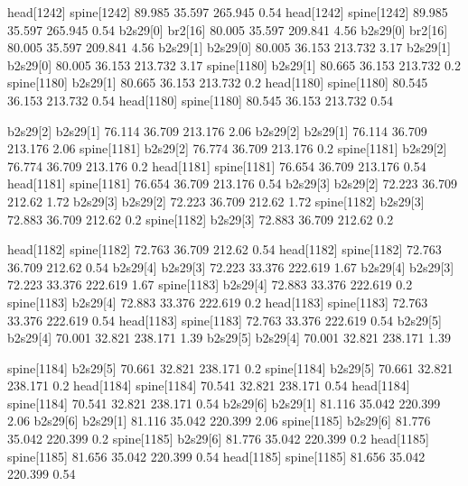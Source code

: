 head[1242]    spine[1242]    89.985    35.597    265.945    0.54
head[1242]    spine[1242]    89.985    35.597    265.945    0.54
b2s29[0]    br2[16]    80.005    35.597    209.841    4.56
b2s29[0]    br2[16]    80.005    35.597    209.841    4.56
b2s29[1]    b2s29[0]    80.005    36.153    213.732    3.17
b2s29[1]    b2s29[0]    80.005    36.153    213.732    3.17
spine[1180]    b2s29[1]    80.665    36.153    213.732    0.2
spine[1180]    b2s29[1]    80.665    36.153    213.732    0.2
head[1180]    spine[1180]    80.545    36.153    213.732    0.54
head[1180]    spine[1180]    80.545    36.153    213.732    0.54


b2s29[2]    b2s29[1]    76.114    36.709    213.176    2.06
b2s29[2]    b2s29[1]    76.114    36.709    213.176    2.06
spine[1181]    b2s29[2]    76.774    36.709    213.176    0.2
spine[1181]    b2s29[2]    76.774    36.709    213.176    0.2
head[1181]    spine[1181]    76.654    36.709    213.176    0.54
head[1181]    spine[1181]    76.654    36.709    213.176    0.54
b2s29[3]    b2s29[2]    72.223    36.709    212.62    1.72
b2s29[3]    b2s29[2]    72.223    36.709    212.62    1.72
spine[1182]    b2s29[3]    72.883    36.709    212.62    0.2
spine[1182]    b2s29[3]    72.883    36.709    212.62    0.2


head[1182]    spine[1182]    72.763    36.709    212.62    0.54
head[1182]    spine[1182]    72.763    36.709    212.62    0.54
b2s29[4]    b2s29[3]    72.223    33.376    222.619    1.67
b2s29[4]    b2s29[3]    72.223    33.376    222.619    1.67
spine[1183]    b2s29[4]    72.883    33.376    222.619    0.2
spine[1183]    b2s29[4]    72.883    33.376    222.619    0.2
head[1183]    spine[1183]    72.763    33.376    222.619    0.54
head[1183]    spine[1183]    72.763    33.376    222.619    0.54
b2s29[5]    b2s29[4]    70.001    32.821    238.171    1.39
b2s29[5]    b2s29[4]    70.001    32.821    238.171    1.39


spine[1184]    b2s29[5]    70.661    32.821    238.171    0.2
spine[1184]    b2s29[5]    70.661    32.821    238.171    0.2
head[1184]    spine[1184]    70.541    32.821    238.171    0.54
head[1184]    spine[1184]    70.541    32.821    238.171    0.54
b2s29[6]    b2s29[1]    81.116    35.042    220.399    2.06
b2s29[6]    b2s29[1]    81.116    35.042    220.399    2.06
spine[1185]    b2s29[6]    81.776    35.042    220.399    0.2
spine[1185]    b2s29[6]    81.776    35.042    220.399    0.2
head[1185]    spine[1185]    81.656    35.042    220.399    0.54
head[1185]    spine[1185]    81.656    35.042    220.399    0.54


